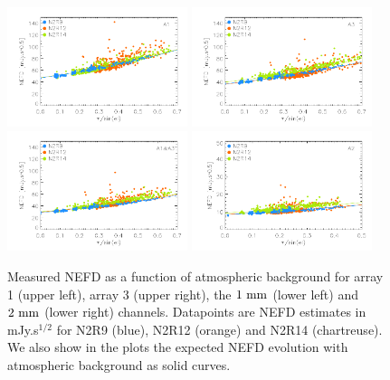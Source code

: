 \begin{figure}
\begin{center}
\includegraphics[clip=true,width=0.47\textwidth]{Figures/NEFD/plot_nefd_vs_obstau_corrected_skydip_vfinal_a1.pdf}
\includegraphics[clip=true,width=0.47\textwidth]{Figures/NEFD/plot_nefd_vs_obstau_corrected_skydip_vfinal_a3.pdf}
\includegraphics[clip=true,width=0.47\textwidth]{Figures/NEFD/plot_nefd_vs_obstau_corrected_skydip_vfinal_1mm.pdf}
\includegraphics[clip=true,width=0.47\textwidth]{Figures/NEFD/plot_nefd_vs_obstau_corrected_skydip_vfinal_a2.pdf}
\caption[Measured NEFD versus observed opacity]{Measured NEFD as a function of
  atmospheric background for array 1 (upper left), array 3 (upper right), the
  $1~\rm{mm}$ (lower left) and $2~\rm{mm}$ (lower right) channels. Datapoints
  are NEFD estimates in mJy.s$^{1/2}$ for N2R9 (blue), N2R12 (orange)
  and N2R14 (chartreuse). We also show in the plots the expected NEFD evolution
  with atmospheric background as solid curves.}
\label{fig:nefdvsbackground_below_1Jy}
\end{center}
\end{figure}
 


